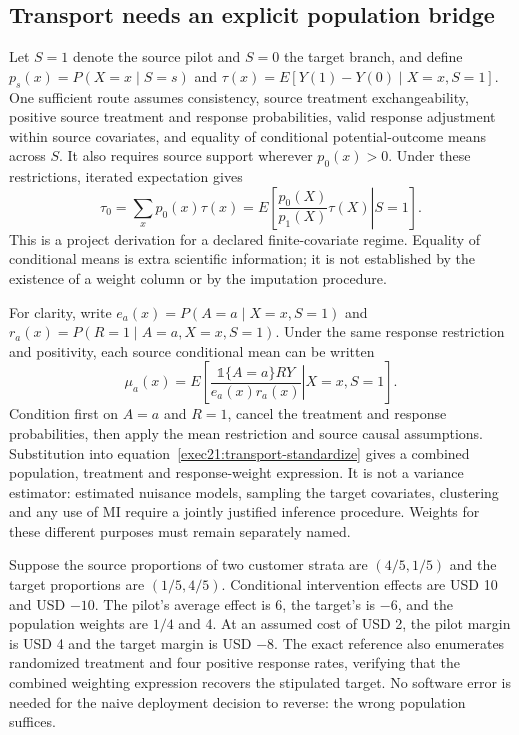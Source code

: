 \subsection{Transport needs an explicit population bridge}
\label{exec21:transport-target}

Let $S=1$ denote the source pilot and $S=0$ the target branch, and define
$p_s(x)=P(X=x\mid S=s)$ and
$\tau(x)=E[Y(1)-Y(0)\mid X=x,S=1]$. One sufficient route assumes consistency,
source treatment exchangeability, positive source treatment and response
probabilities, valid response adjustment within source covariates, and equality
of conditional potential-outcome means across $S$. It also requires source
support wherever $p_0(x)>0$. Under these restrictions, iterated expectation gives
\begin{equation}
 \tau_0=\sum_x p_0(x)\tau(x)
       =E\left[\left.\frac{p_0(X)}{p_1(X)}\tau(X)\right|S=1\right].
 \label{exec21:transport-standardize}
\end{equation}
This is a project derivation for a declared finite-covariate regime. Equality of
conditional means is extra scientific information; it is not established by
the existence of a weight column or by the imputation procedure.
\citep{exec21_transport_reference}

For clarity, write $e_a(x)=P(A=a\mid X=x,S=1)$ and
$r_a(x)=P(R=1\mid A=a,X=x,S=1)$. Under the same response restriction and
positivity, each source conditional mean can be written
\begin{equation}
 \mu_a(x)=E\left[\left.
       \frac{\mathbb{1}\{A=a\}RY}{e_a(x)r_a(x)}
       \right|X=x,S=1\right].
 \label{exec21:transport-response}
\end{equation}
Condition first on $A=a$ and $R=1$, cancel the treatment and response
probabilities, then apply the mean restriction and source causal assumptions.
Substitution into equation~\eqref{exec21:transport-standardize} gives a
combined population, treatment and response-weight expression. It is not a
variance estimator: estimated nuisance models, sampling the target covariates,
clustering and any use of MI require a jointly justified inference procedure.
Weights for these different purposes must remain separately named.

Suppose the source proportions of two customer strata are $(4/5,1/5)$ and the
target proportions are $(1/5,4/5)$. Conditional intervention effects are USD
10 and USD $-10$. The pilot's average effect is 6, the target's is $-6$, and
the population weights are $1/4$ and 4. At an assumed cost of USD 2, the pilot
margin is USD 4 and the target margin is USD $-8$. The exact reference also
enumerates randomized treatment and four positive response rates, verifying
that the combined weighting expression recovers the stipulated target.
No software error is needed for the naive deployment decision to reverse:
the wrong population suffices. \citep{exec21_transport_reference}

